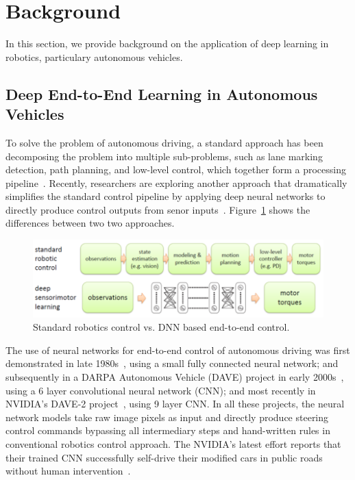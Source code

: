 \section{Background} \label{sec:background}

In this section, we provide background on the application of deep
learning in robotics, particulary autonomous vehicles.

\subsection{Deep End-to-End Learning in Autonomous Vehicles}


To solve the problem of autonomous driving, a standard approach has
been decomposing the problem into multiple sub-problems,
such as lane marking detection, path planning, and low-level
control, which together form a processing pipeline~\cite{Bojarski2016}.
Recently, researchers are exploring another approach that dramatically
simplifies the standard control pipeline by applying deep neural
networks to directly produce control outputs from senor
inputs~\cite{Levine2016}. Figure~\ref{fig:end-to-end-control}
shows the differences between two two approaches.

\begin{figure}[h]
  \centering
  \includegraphics[width=.5\textwidth]{figs/endtoend}
  \caption{Standard robotics control vs. DNN based end-to-end
    control. }
  \label{fig:end-to-end-control}
\end{figure}

The use of neural networks for end-to-end control of autonomous
driving was first demonstrated in late 1980s~\cite{Pomerleau1989},
using a small fully connected neural network; and subsequently in a
DARPA Autonomous Vehicle (DAVE) project in early
2000s~\cite{LeCun:04}, using a 6 layer convolutional neural network
(CNN); and most recently in NVIDIA's DAVE-2
project~\cite{Bojarski2016}, using 9 layer CNN. In all these projects,
the neural network models take raw image pixels as input and directly
produce steering control commands bypassing all intermediary steps and
hand-written rules in conventional robotics control approach. The
NVIDIA's latest effort reports that their trained CNN successfully 
self-drive their modified cars in public roads without human
intervention~\cite{Bojarski2016}.

